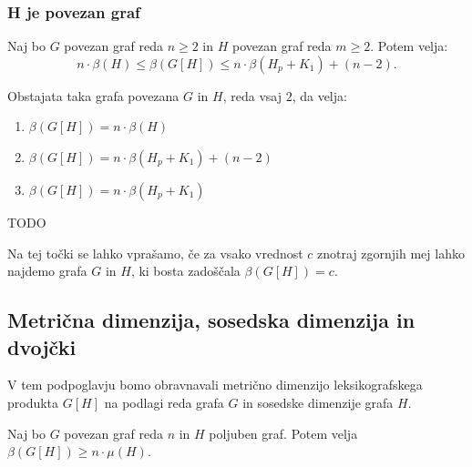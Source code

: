 \documentclass[mat1, tisk]{fmfdelo}
\newcommand{\1}{(1, 1, ..., 1)}
\newcommand{\2}{(2, 2, ..., 2)}
\begin{document}


\subsubsection{H je povezan graf} \label{sss:povzean}


\begin{izrek} \label{izrek:primeri_mdim_komp_povezan}
    Naj bo $G$ povezan graf reda $n \geq 2$ in $H$ povezan graf reda $m \geq 2$. Potem velja:
    $$
    n \cdot \beta(H)  
    \leq \beta(G[H]) \leq 
    n \cdot \beta(H_p + K_1) + (n-2). 
    $$
\end{izrek}

\begin{izrek} \label{izrek:omejitve_mdim_komp_povezan}
    Obstajata taka grafa povezana $G$ in $H$, reda vsaj $2$, da velja:
    \begin{enumerate}
        \item $\beta(G[H]) = n \cdot \beta(H)$
        \item $\beta(G[H]) = n \cdot \beta(H_p + K_1) + (n-2)$
        \item $\beta(G[H]) = n \cdot \beta(H_p + K_1)$
    \end{enumerate}
\end{izrek}
    
\begin{dokaz}
    TODO
\end{dokaz}

Na tej točki se lahko vprašamo, če za vsako vrednost $c$ znotraj zgornjih mej lahko najdemo
grafa $G$ in $H$, ki bosta zadoščala $\beta(G[H]) = c$.



\subsection{Metrična dimenzija, sosedska dimenzija in dvojčki}
V tem podpoglavju bomo obravnavali metrično dimenzijo leksikografskega produkta $G[H]$ na 
podlagi reda grafa $G$ in sosedske dimenzije grafa $H$. 

\begin{lema}
    Naj bo $G$ povezan graf reda $n$ in $H$ poljuben graf. Potem velja
    $\beta(G[H]) \geq n \cdot \mu(H).$
\end{lema}
\end{document}
